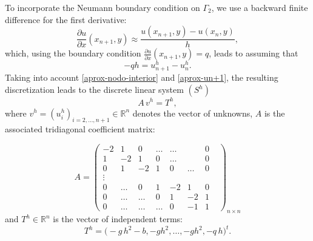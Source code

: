 \documentclass[axioms,article,submit,moreauthors]{Definitions/mdpi}
\begin{document}
To incorporate the Neumann boundary condition on $\Gamma_2$,  we use a backward finite difference for the first derivative:
\begin{equation}\label{aprox-Neumann}
\frac{\partial u}{\partial x}(x_{n+1},y)\approx 
\frac{u(x_{n+1},y)-u(x_{n},y)}{h},
\end{equation}
which, using the boundary condition 
\(\frac{\partial u}{\partial x}(x_{n+1},y)=q\),
leads to {assuming that}
\begin{equation}\label{aprox-un+1}
-qh = {u^h_{n+1}} - {u^h_{n}}.
\end{equation}
{Taking into account  \eqref{aprox-nodo-interior} and \eqref{aprox-un+1}, the resulting discretization leads to the} discrete linear system ${(S^h)}$
\begin{equation}\label{sistema-tradicional}
{A\,v^h = T^h,}
\end{equation}
where ${v^h} = ({u^h_i})_{i=2,\ldots,n+1}\in\mathbb{R}^{n}$ {denotes} the vector of unknowns, $A$ is the associated tridiagonal coefficient matrix:

    					\begin{equation}\label{matrizA}
    					A=\begin{pmatrix}
-2 & 1 & 0 & \ldots & \ldots & & 0 &\\                                                                                                   
1 &-2 & 1&0 &\ldots &&0 \\
0 &1& -2 & 1&0&\ldots &0 \\
\vdots\\
0 &\ldots &0 & 1&-2 & 1 &0\\
0 &\ldots & \ldots & 0&1 & -2 & 1\\
 0 &\ldots& \ldots& \ldots &  0& -1 &1
\end{pmatrix}_{n\times n}
\end{equation} 
    and ${T^h}\in \mathbb{R}^n$ is  the vector of independent terms:
    \begin{equation}\label{vectorT}
     {T^h}= \Big(-g\,h^2 - b, -g h^2, \ldots, -g h^2, -q\,h  \Big)^t.\end{equation}
    
\end{document}
